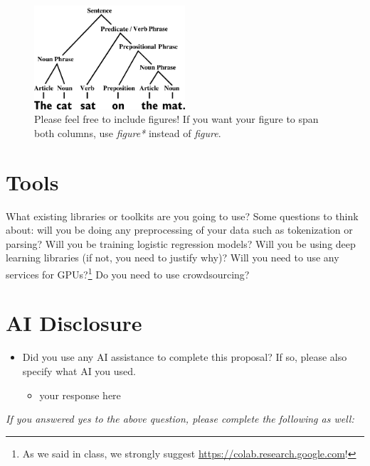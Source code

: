 \documentclass[11pt,a4paper]{article}
\begin{document}
\begin{figure}[t]
    \centering
    \includegraphics[width=0.5\textwidth]{figs/sentence.png}
    \caption{Please feel free to include figures! If you want your figure to span both columns, use \emph{figure*} instead of \emph{figure}.}
    \label{fig:example}
\end{figure}

\section{Tools}
What existing libraries or toolkits are you going to use? Some questions to think about: will you be doing any preprocessing of your data such as tokenization or parsing? Will you be training logistic regression models? Will you be using deep learning libraries (if not, you need to justify why)? Will you need to use any services for GPUs?\footnote{As we said in class, we strongly suggest \url{https://colab.research.google.com}!} Do you need to use crowdsourcing?

\section{AI Disclosure}
\begin{itemize}
    \item Did you use any AI assistance to complete this proposal? If so, please also specify what AI you used.
    \begin{itemize}
        \item your response here
    \end{itemize}
\end{itemize}

\noindent\textit{If you answered yes to the above question, please complete the following as well:}
\end{document}
